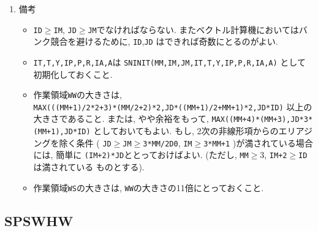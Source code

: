 \documentclass[a4j,fleqn]{jarticle}
\begin{document}
\begin{enumerate}
\item 備考

\begin{itemize}

\item {\tt ID}$\ge${\tt IM}, {\tt JD}$\ge${\tt JM}でなければならない.
   またベクトル計算機においてはバンク競合を避けるために, {\tt ID},{\tt JD}
   はできれば奇数にとるのがよい.

\item {\tt IT,T,Y,IP,P,R,IA,A}は 
      {\tt SNINIT(MM,IM,JM,IT,T,Y,IP,P,R,IA,A)} として初期化しておくこと.\\

\item 作業領域{\tt WW}の大きさは, \\
     {\tt MAX(((MM+1)/2*2+3)*(MM/2+2)*2,JD*((MM+1)/2+MM+1)*2,JD*ID)}
    以上の大きさであること. または, やや余裕をもって,
     {\tt MAX((MM+4)*(MM+3),JD*3*(MM+1),JD*ID)}
    としておいてもよい. もし, 2次の非線形項からのエリアジングを除く条件
     ( {\tt JD}$\ge${\tt JM}$\ge${\tt 3*MM/2D0}, 
      {\tt IM}$\ge${\tt 3*MM+1} )が満されている場合には, 簡単に
      {\tt (IM+2)*JD}ととっておけばよい.
     (ただし, {\tt MM}$\ge 3$, {\tt IM+2}$\ge${\tt ID}は満されている
    ものとする).

\item 作業領域{\tt WS}の大きさは, {\tt WW}の大きさの11倍にとっておくこと.

\end{itemize}

\end{enumerate}


\subsection{SPSWHW}
\end{document}
